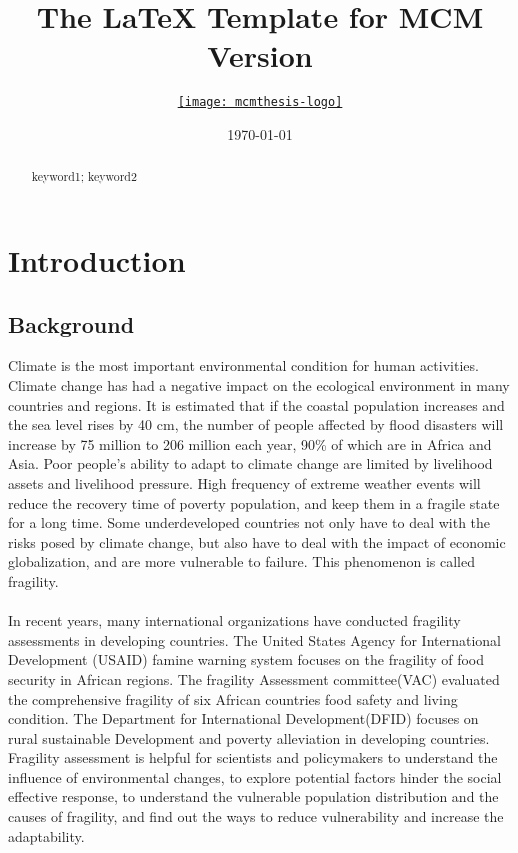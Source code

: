 \documentclass{mcmthesis}
\title{The \LaTeX{} Template for MCM Version \MCMversion}
\author{\small \href{http://www.latexstudio.net/}
  {\texttt{[image: mcmthesis-logo]}}}
\date{\today}
\begin{document}
\begin{abstract}
\lipsum[1]
\begin{keywords}
keyword1; keyword2
\end{keywords}
\end{abstract}
\maketitle
\tableofcontents

\newpage
\section{Introduction}
\subsection{Background}
Climate is the most important environmental condition for human activities.
Climate change has had a negative impact on the ecological environment in 
many countries and regions. It is estimated that if the coastal population 
increases and the sea level rises by 40 cm, the number of people affected by 
flood disasters will increase by 75 million to 206 million each year, 90\% of
which are in Africa and Asia. Poor people's ability to adapt to climate change 
are limited by livelihood assets and livelihood pressure. High frequency of
extreme weather events will reduce the recovery time of poverty population, 
and keep them in a fragile state for a long time. Some underdeveloped 
countries not only have to deal with the risks posed by climate change, 
but also have to deal with the impact of economic globalization, 
and are more vulnerable to failure. This phenomenon is called fragility.\\\\
In recent years, many international organizations have conducted fragility 
assessments in developing countries. The United States Agency for International
Development (USAID) famine warning system focuses on the fragility of 
food security in African regions. The fragility Assessment committee(VAC) 
evaluated the comprehensive fragility of six African countries food safety 
and living condition. The Department for International Development(DFID)
focuses on rural sustainable Development and poverty alleviation in developing
countries. Fragility assessment is helpful for scientists and 
policymakers to understand the influence of environmental changes, 
to explore potential factors hinder the social effective response, 
to understand the vulnerable population distribution and the causes 
of fragility, and find out the ways to reduce vulnerability and 
increase the adaptability.
\end{document}
